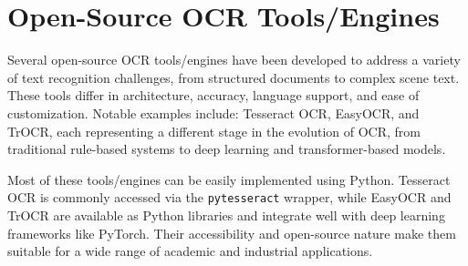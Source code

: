 

\section{Open-Source OCR Tools/Engines}

Several open-source OCR tools/engines have been developed to address a variety of text recognition challenges, from structured documents to complex scene text. These tools differ in architecture, accuracy, language support, and ease of customization. Notable examples include: Tesseract OCR, EasyOCR, and TrOCR, each representing a different stage in the evolution of OCR, from traditional rule-based systems to deep learning and transformer-based models.

Most of these tools/engines can be easily implemented using Python. Tesseract OCR is commonly accessed via the \texttt{pytesseract} wrapper, while EasyOCR and TrOCR are available as Python libraries and integrate well with deep learning frameworks like PyTorch. Their accessibility and open-source nature make them suitable for a wide range of academic and industrial applications. %


